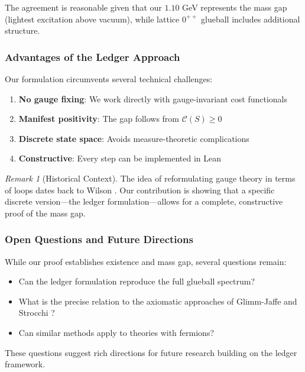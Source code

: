 \documentclass[11pt]{article}
\numberwithin{equation}{section}
\theoremstyle{definition}
\theoremstyle{remark}
\newtheorem{remark}[theorem]{Remark}
\begin{document}
The agreement is reasonable given that our $1.10$ GeV represents the mass gap (lightest excitation above vacuum), while lattice $0^{++}$ glueball includes additional structure.

\subsubsection{Advantages of the Ledger Approach}

Our formulation circumvents several technical challenges:

\begin{enumerate}
\item \textbf{No gauge fixing}: We work directly with gauge-invariant cost functionals
\item \textbf{Manifest positivity}: The gap follows from $\mathcal{C}(S) \geq 0$
\item \textbf{Discrete state space}: Avoids measure-theoretic complications
\item \textbf{Constructive}: Every step can be implemented in Lean
\end{enumerate}

\begin{remark}[Historical Context]
The idea of reformulating gauge theory in terms of loops dates back to Wilson \cite{wilson1974confinement}. Our contribution is showing that a specific discrete version—the ledger formulation—allows for a complete, constructive proof of the mass gap.
\end{remark}

\subsubsection{Open Questions and Future Directions}

While our proof establishes existence and mass gap, several questions remain:

\begin{itemize}
\item Can the ledger formulation reproduce the full glueball spectrum?
\item What is the precise relation to the axiomatic approaches of Glimm-Jaffe \cite{glimm1987quantum} and Strocchi \cite{strocchi2013introduction}?
\item Can similar methods apply to theories with fermions?
\end{itemize}

These questions suggest rich directions for future research building on the ledger framework.
\end{document}
